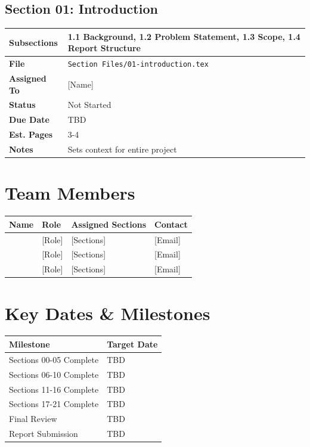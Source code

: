 \documentclass[12pt]{article}
\begin{document}
\subsection*{Section 01: Introduction}
\begin{tabular}{|l|l|}
\hline
\textbf{Subsections} & 1.1 Background, 1.2 Problem Statement, 1.3 Scope, 1.4 Report Structure \\
\hline
\textbf{File} & \texttt{Section Files/01-introduction.tex} \\
\hline
\textbf{Assigned To} & [Name] \\
\hline
\textbf{Status} & Not Started \\
\hline
\textbf{Due Date} & TBD \\
\hline
\textbf{Est. Pages} & 3-4 \\
\hline
\textbf{Notes} & Sets context for entire project \\
\hline
\end{tabular}

\vspace{0.5cm}


\newpage

\section*{Team Members}

\begin{tabular}{|l|l|l|l|}
\hline
\textbf{Name} & \textbf{Role} & \textbf{Assigned Sections} & \textbf{Contact} \\
\hline
[Team Member 1] & [Role] & [Sections] & [Email] \\
\hline
[Team Member 2] & [Role] & [Sections] & [Email] \\
\hline
[Team Member 3] & [Role] & [Sections] & [Email] \\
\hline
\end{tabular}

\section*{Key Dates \& Milestones}

\begin{tabular}{|l|l|}
\hline
\textbf{Milestone} & \textbf{Target Date} \\
\hline
Sections 00-05 Complete & TBD \\
\hline
Sections 06-10 Complete & TBD \\
\hline
Sections 11-16 Complete & TBD \\
\hline
Sections 17-21 Complete & TBD \\
\hline
Final Review & TBD \\
\hline
Report Submission & TBD \\
\hline
\end{tabular}
\end{document}

